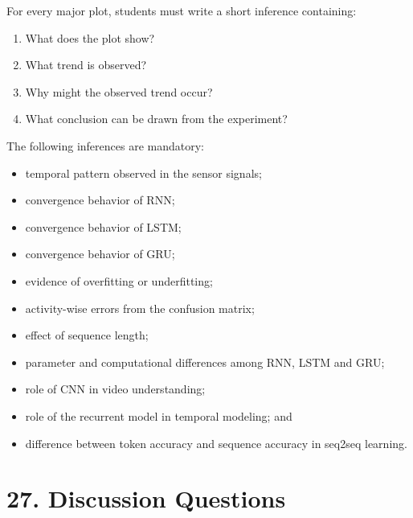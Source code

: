 \documentclass[10pt]{article}
\begin{document}
For every major plot, students must write a short inference containing:

\begin{enumerate}
\item What does the plot show?
\item What trend is observed?
\item Why might the observed trend occur?
\item What conclusion can be drawn from the experiment?
\end{enumerate}

The following inferences are mandatory:

\begin{itemize}
\item temporal pattern observed in the sensor signals;
\item convergence behavior of RNN;
\item convergence behavior of LSTM;
\item convergence behavior of GRU;
\item evidence of overfitting or underfitting;
\item activity-wise errors from the confusion matrix;
\item effect of sequence length;
\item parameter and computational differences among RNN, LSTM and GRU;
\item role of CNN in video understanding;
\item role of the recurrent model in temporal modeling; and
\item difference between token accuracy and sequence accuracy in seq2seq learning.
\end{itemize}

\section*{27. Discussion Questions}
\end{document}
